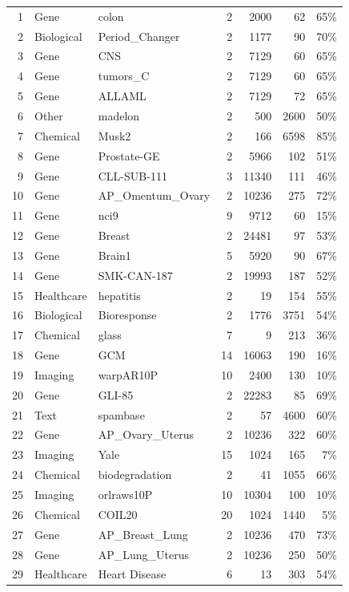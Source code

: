 \documentclass[preprint,12pt,authoryear]{elsarticle}
\begin{document}
{{{\begin{longtable}{@{}r p{1.9cm} p{6.7cm} r r r r@{}}
1 & Gene & colon & 2 & 2000 & 62 & 65\% \\
2 & Biological & Period\_Changer & 2 & 1177 & 90 & 70\% \\
3 & Gene & CNS & 2 & 7129 & 60 & 65\% \\
4 & Gene & tumors\_C & 2 & 7129 & 60 & 65\% \\
5 & Gene & ALLAML & 2 & 7129 & 72 & 65\% \\
6 & Other & madelon & 2 & 500 & 2600 & 50\% \\
7 & Chemical & Musk2 & 2 & 166 & 6598 & 85\% \\
8 & Gene & Prostate-GE & 2 & 5966 & 102 & 51\% \\
9 & Gene & CLL-SUB-111 & 3 & 11340 & 111 & 46\% \\
10 & Gene & AP\_Omentum\_Ovary & 2 & 10236 & 275 & 72\% \\
11 & Gene & nci9 & 9 & 9712 & 60 & 15\% \\
12 & Gene & Breast & 2 & 24481 & 97 & 53\% \\
13 & Gene & Brain1 & 5 & 5920 & 90 & 67\% \\
14 & Gene & SMK-CAN-187 & 2 & 19993 & 187 & 52\% \\
15 & Healthcare & hepatitis & 2 & 19 & 154 & 55\% \\
16 & Biological & Bioresponse & 2 & 1776 & 3751 & 54\% \\
17 & Chemical & glass & 7 & 9 & 213 & 36\% \\
18 & Gene & GCM & 14 & 16063 & 190 & 16\% \\
19 & Imaging & warpAR10P & 10 & 2400 & 130 & 10\% \\
20 & Gene & GLI-85 & 2 & 22283 & 85 & 69\% \\
21 & Text & spambase & 2 & 57 & 4600 & 60\% \\
22 & Gene & AP\_Ovary\_Uterus & 2 & 10236 & 322 & 60\% \\
23 & Imaging & Yale & 15 & 1024 & 165 & 7\% \\
24 & Chemical & biodegradation & 2 & 41 & 1055 & 66\% \\
25 & Imaging & orlraws10P & 10 & 10304 & 100 & 10\% \\
26 & Chemical & COIL20 & 20 & 1024 & 1440 & 5\% \\
27 & Gene & AP\_Breast\_Lung & 2 & 10236 & 470 & 73\% \\
28 & Gene & AP\_Lung\_Uterus & 2 & 10236 & 250 & 50\% \\
29 & Healthcare & Heart Disease & 6 & 13 & 303 & 54\% \\

\end{longtable}}}}
\end{document}
